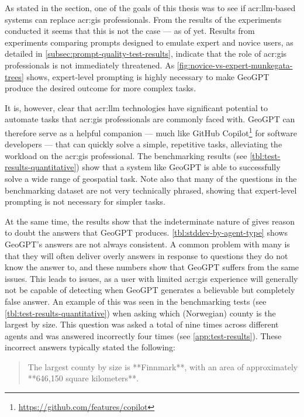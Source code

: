 As stated in the  section, one of the goals of this thesis was to see if \acrshort{acr:llm}-based systems can replace \acrshort{acr:gis} professionals. From the results of the experiments conducted it seems that this is not the case --- as of yet. Results from experiments comparing prompts designed to emulate expert and novice users, as detailed in \autoref{subsec:prompt-quality-test-results}, indicate that the role of \acrshort{acr:gis} professionals is not immediately threatened. As \autoref{fig:novice-vs-expert-munkegata-trees} shows, expert-level prompting is highly necessary to make GeoGPT produce the desired outcome for more complex tasks.

It is, however, clear that \acrshort{acr:llm} technologies have significant potential to automate tasks that \acrshort{acr:gis} professionals are commonly faced with. GeoGPT can therefore serve as a helpful companion --- much like GitHub Copilot\footnote{\url{https://github.com/features/copilot}} for software developers --- that can quickly solve a simple, repetitive tasks, alleviating the workload on the \acrshort{acr:gis} professional. The benchmarking results (see \autoref{tbl:test-results-quantitative}) show that a system like GeoGPT is able to successfully solve a wide range of geospatial task. Note also that many of the questions in the benchmarking dataset are not very technically phrased, showing that expert-level prompting is not necessary for simpler tasks.

At the same time, the results show that the indeterminate nature of  gives reason to doubt the answers that GeoGPT produces. \autoref{tbl:stddev-by-agent-type} shows GeoGPT's answers are not always consistent. A common problem with many  is that they will often deliver overly answers in response to questions they do not know the answer to, and these numbers show that GeoGPT suffers from the same issues. This leads to issues, as a user with limited \acrshort{acr:gis} experience will generally not be capable of detecting when GeoGPT generates a believable but completely false answer. An example of this was seen in the benchmarking tests (see \autoref{tbl:test-results-quantitative}) when asking which (Norwegian) county is the largest by size. This question was asked a total of nine times across different agents and was answered incorrectly four times (see \autoref{app:test-results}). These incorrect answers typically stated the following:

\begin{quote}
    The largest county by size is **Finnmark**, with an area of approximately **646,150 square kilometers**.
\end{quote}

